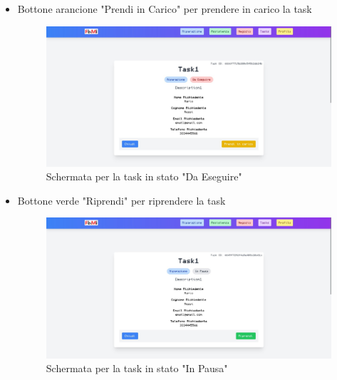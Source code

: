 \documentclass{report}
\begin{document}
\begin{itemize}
	\item Bottone arancione "Prendi in Carico" per prendere in carico la task
	\begin{figure}[H]
		\centering\includegraphics[width=1\textwidth]{images/microservizio-task/frontend/DaEseguire.jpg}
		\caption{Schermata per la task in stato "Da Eseguire"}
	\end{figure}
\end{itemize}

\begin{itemize}
	\item Bottone verde "Riprendi" per riprendere la task
	\begin{figure}[H]
		\centering\includegraphics[width=1\textwidth]{images/microservizio-task/frontend/InPausa.jpg}
		\caption{Schermata per la task in stato "In Pausa"}
	\end{figure}
\end{itemize}
\end{document}
